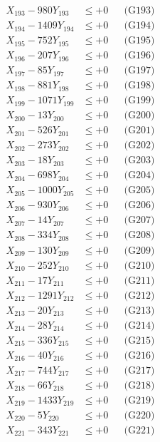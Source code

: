 \documentclass[a4paper,10pt]{article}
\begin{document}
{\begin{align}
X_{193} - 980Y_{193} &\leq +0 && \text{(G193)} \\
X_{194} - 1409Y_{194} &\leq +0 && \text{(G194)} \\
X_{195} - 752Y_{195} &\leq +0 && \text{(G195)} \\
X_{196} - 207Y_{196} &\leq +0 && \text{(G196)} \\
X_{197} - 85Y_{197} &\leq +0 && \text{(G197)} \\
X_{198} - 881Y_{198} &\leq +0 && \text{(G198)} \\
X_{199} - 1071Y_{199} &\leq +0 && \text{(G199)} \\
X_{200} - 13Y_{200} &\leq +0 && \text{(G200)} \\
\allowbreak
X_{201} - 526Y_{201} &\leq +0 && \text{(G201)} \\
X_{202} - 273Y_{202} &\leq +0 && \text{(G202)} \\
X_{203} - 18Y_{203} &\leq +0 && \text{(G203)} \\
X_{204} - 698Y_{204} &\leq +0 && \text{(G204)} \\
X_{205} - 1000Y_{205} &\leq +0 && \text{(G205)} \\
X_{206} - 930Y_{206} &\leq +0 && \text{(G206)} \\
X_{207} - 14Y_{207} &\leq +0 && \text{(G207)} \\
X_{208} - 334Y_{208} &\leq +0 && \text{(G208)} \\
X_{209} - 130Y_{209} &\leq +0 && \text{(G209)} \\
X_{210} - 252Y_{210} &\leq +0 && \text{(G210)} \\
\allowbreak
X_{211} - 17Y_{211} &\leq +0 && \text{(G211)} \\
X_{212} - 1291Y_{212} &\leq +0 && \text{(G212)} \\
X_{213} - 20Y_{213} &\leq +0 && \text{(G213)} \\
X_{214} - 28Y_{214} &\leq +0 && \text{(G214)} \\
X_{215} - 336Y_{215} &\leq +0 && \text{(G215)} \\
X_{216} - 40Y_{216} &\leq +0 && \text{(G216)} \\
X_{217} - 744Y_{217} &\leq +0 && \text{(G217)} \\
X_{218} - 66Y_{218} &\leq +0 && \text{(G218)} \\
X_{219} - 1433Y_{219} &\leq +0 && \text{(G219)} \\
X_{220} - 5Y_{220} &\leq +0 && \text{(G220)} \\
\allowbreak
X_{221} - 343Y_{221} &\leq +0 && \text{(G221)} \\

\end{align}}
\end{document}
